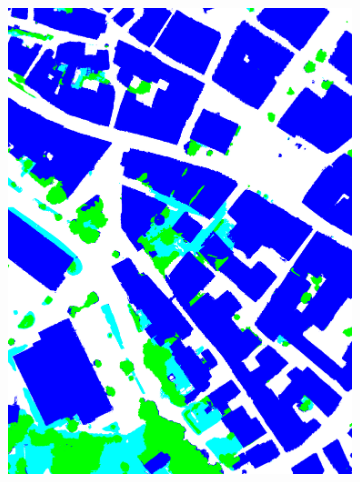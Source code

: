 \begin{figure}[htb]
\begin{subfigure}{0.19\textwidth}
  \includegraphics[width=1\linewidth]{fig/vai/5_anno.png}
\end{subfigure}
\begin{subfigure}{0.19\textwidth}
  \centering

\end{subfigure}
\end{figure}
